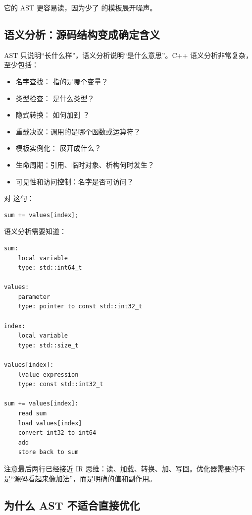 它的 AST 更容易读，因为少了  的模板展开噪声。

\subsection{语义分析：源码结构变成确定含义}

AST 只说明“长什么样”，语义分析说明“是什么意思”。C++ 语义分析非常复杂，至少包括：

\begin{itemize}
  \item 名字查找： 指的是哪个变量？
  \item 类型检查： 是什么类型？
  \item 隐式转换： 如何加到 ？
  \item 重载决议：调用的是哪个函数或运算符？
  \item 模板实例化： 展开成什么？
  \item 生命周期：引用、临时对象、析构何时发生？
  \item 可见性和访问控制：名字是否可访问？
\end{itemize}

对  这句：

\begin{lstlisting}[language=C++]
sum += values[index];
\end{lstlisting}

语义分析需要知道：

\begin{lstlisting}
sum:
    local variable
    type: std::int64_t

values:
    parameter
    type: pointer to const std::int32_t

index:
    local variable
    type: std::size_t

values[index]:
    lvalue expression
    type: const std::int32_t

sum += values[index]:
    read sum
    load values[index]
    convert int32 to int64
    add
    store back to sum
\end{lstlisting}

注意最后两行已经接近 IR 思维：读、加载、转换、加、写回。优化器需要的不是“源码看起来像加法”，而是明确的值和副作用。

\subsection{为什么 AST 不适合直接优化}

